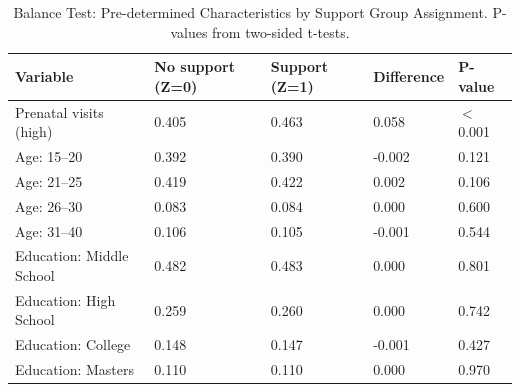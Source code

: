 \begin{table}[h!]
\centering
\caption{Balance Test: Pre-determined Characteristics by Support Group Assignment. P-values from two-sided t-tests.} 
\label{tab:balance}
\begingroup\small
\begin{tabular}{lllll}
  \toprule
Variable & No support (Z=0) & Support (Z=1) & Difference & P-value \\ 
  \midrule
Prenatal visits (high) & 0.405 & 0.463 & 0.058 & $<$0.001 \\ 
  Age: 15--20 & 0.392 & 0.390 & -0.002 & 0.121 \\ 
  Age: 21--25 & 0.419 & 0.422 & 0.002 & 0.106 \\ 
  Age: 26--30 & 0.083 & 0.084 & 0.000 & 0.600 \\ 
  Age: 31--40 & 0.106 & 0.105 & -0.001 & 0.544 \\ 
  Education: Middle School & 0.482 & 0.483 & 0.000 & 0.801 \\ 
  Education: High School & 0.259 & 0.260 & 0.000 & 0.742 \\ 
  Education: College & 0.148 & 0.147 & -0.001 & 0.427 \\ 
  Education: Masters & 0.110 & 0.110 & 0.000 & 0.970 \\ 
   \bottomrule
\end{tabular}
\endgroup
\end{table}
